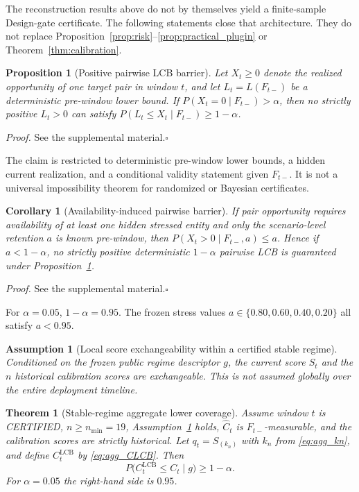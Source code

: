\documentclass[letterpaper,journal]{IEEEtran}
\newtheorem{theorem}{Theorem}
\newtheorem{proposition}{Proposition}
\newtheorem{assumption}{Assumption}
\newtheorem{corollary}{Corollary}
\begin{document}
The reconstruction results above do not by themselves yield a finite-sample
Design-gate certificate.  The following statements close that architecture.
They do not replace Proposition~\ref{prop:risk}--\ref{prop:practical_plugin}
or Theorem~\ref{thm:calibration}.

\begin{proposition}[Positive pairwise LCB barrier]
\label{prop:pairwise-lcb-barrier}
Let $X_t\ge 0$ denote the realized opportunity of one target pair in window
$t$, and let $L_t=L(F_{t-})$ be a deterministic pre-window lower bound.  If
$P(X_t=0\mid F_{t-})>\alpha$, then no strictly positive $L_t>0$ can satisfy
$P(L_t\le X_t\mid F_{t-})\ge 1-\alpha$.
\end{proposition}

\noindent\emph{Proof.}
See the supplemental material.\hfill$\square$

The claim is restricted to deterministic pre-window lower bounds, a hidden
current realization, and a conditional validity statement given $F_{t-}$.  It
is not a universal impossibility theorem for randomized or Bayesian
certificates.

\begin{corollary}[Availability-induced pairwise barrier]
\label{cor:availability-barrier}
If pair opportunity requires availability of at least one hidden stressed
entity and only the scenario-level retention $a$ is known pre-window, then
$P(X_t>0\mid F_{t-},a)\le a$.  Hence if $a<1-\alpha$, no strictly positive
deterministic $1-\alpha$ pairwise LCB is guaranteed under
Proposition~\ref{prop:pairwise-lcb-barrier}.
\end{corollary}

\noindent\emph{Proof.}
See the supplemental material.\hfill$\square$

For $\alpha=0.05$, $1-\alpha=0.95$.  The frozen stress values
$a\in\{0.80,0.60,0.40,0.20\}$ all satisfy $a<0.95$.

\begin{assumption}[Local score exchangeability within a certified stable regime]
\label{ass:score-exchangeability}
Conditioned on the frozen public regime descriptor $g$, the current score
$S_t$ and the $n$ historical calibration scores are exchangeable.  This is
not assumed globally over the entire deployment timeline.
\end{assumption}

\begin{theorem}[Stable-regime aggregate lower coverage]
\label{thm:agg-lcb}
Assume window $t$ is CERTIFIED, $n\ge n_{\min}=19$,
Assumption~\ref{ass:score-exchangeability} holds, $\widehat C_t$ is
$F_{t-}$-measurable, and the calibration scores are strictly historical.  Let
$q_t=S_{(k_n)}$ with $k_n$ from \eqref{eq:agg_kn}, and define
$C^{\mathrm{LCB}}_t$ by \eqref{eq:agg_CLCB}.  Then
\begin{equation}
 P\bigl(C^{\mathrm{LCB}}_t\le C_t\mid g\bigr)\ge 1-\alpha.
 \label{eq:agg_thm1}
\end{equation}
For $\alpha=0.05$ the right-hand side is $0.95$.
\end{theorem}
\end{document}
